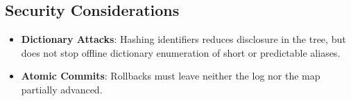 \documentclass[
]{article}
\providecommand{\tightlist}{%
  \setlength{\itemsep}{0pt}\setlength{\parskip}{0pt}}
\begin{document}
\hypertarget{security-considerations}{%
\subsection{Security Considerations}\label{security-considerations}}

\begin{itemize}
\tightlist
\item
  \textbf{Dictionary Attacks}: Hashing identifiers reduces disclosure in
  the tree, but does not stop offline dictionary enumeration of short or
  predictable aliases.
\item
  \textbf{Atomic Commits}: Rollbacks must leave neither the log nor the
  map partially advanced.
\end{itemize}
\end{document}
